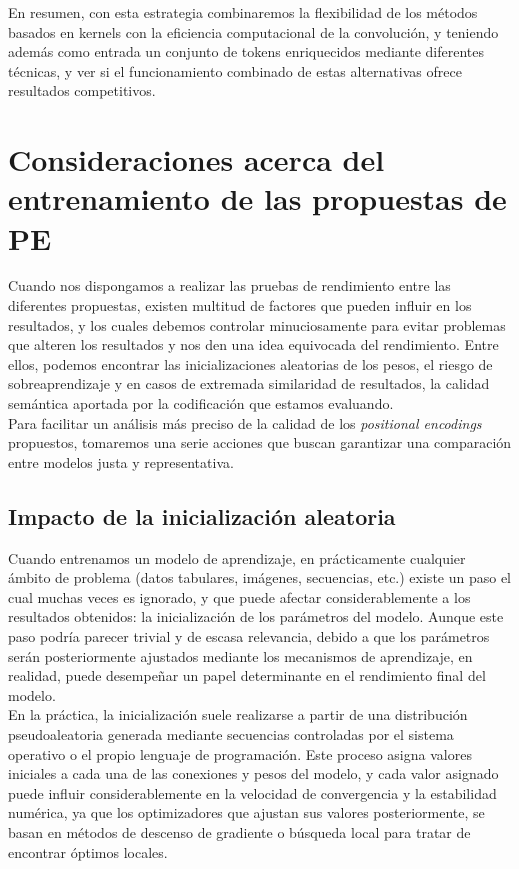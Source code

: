En resumen, con esta estrategia combinaremos la flexibilidad de los métodos basados en kernels con la eficiencia computacional de la convolución, y teniendo además como entrada un conjunto de tokens enriquecidos mediante diferentes técnicas, y ver si el funcionamiento combinado de estas alternativas ofrece resultados competitivos.


\section{Consideraciones acerca del entrenamiento de las propuestas de PE}

Cuando nos dispongamos a realizar las pruebas de rendimiento entre las diferentes propuestas, existen multitud de factores que pueden influir en los resultados, y los cuales debemos controlar minuciosamente para evitar problemas que alteren los resultados y nos den una idea equivocada del rendimiento. Entre ellos, podemos encontrar las inicializaciones aleatorias de los pesos, el riesgo de sobreaprendizaje y en casos de extremada similaridad de resultados, la calidad semántica aportada por la codificación que estamos evaluando.\\

Para facilitar un análisis más preciso de la calidad de los \textit{positional encodings} propuestos, tomaremos una serie acciones que buscan garantizar una comparación entre modelos justa y representativa. 

\subsection{Impacto de la inicialización aleatoria}

Cuando entrenamos un modelo de aprendizaje, en prácticamente cualquier ámbito de problema (datos tabulares, imágenes, secuencias, etc.) existe un paso el cual muchas veces es ignorado, y que puede afectar considerablemente a los resultados obtenidos: la inicialización de los parámetros del modelo. Aunque este paso podría parecer trivial y de escasa relevancia, debido a que los parámetros serán posteriormente ajustados mediante los mecanismos de aprendizaje, en realidad, puede desempeñar un papel determinante en el rendimiento final del modelo.\\

En la práctica, la inicialización suele realizarse a partir de una distribución pseudoaleatoria generada mediante secuencias controladas por el sistema operativo o el propio lenguaje de programación. Este proceso asigna valores iniciales a cada una de las conexiones y pesos del modelo, y cada valor asignado puede influir considerablemente en la velocidad de convergencia y la estabilidad numérica, ya que los optimizadores que ajustan sus valores posteriormente, se basan en métodos de descenso de gradiente o búsqueda local para tratar de encontrar óptimos locales.\\

